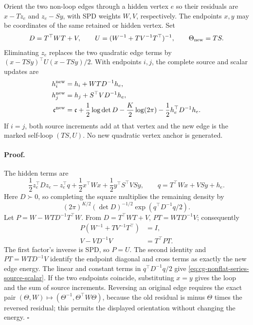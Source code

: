 Orient the two non-loop edges through a hidden vertex \(e\) so their
residuals are \(x-Tz_e\) and \(z_e-Sy\), with SPD weights \(W,V\),
respectively. The endpoints \(x,y\) may be coordinates of the same
retained or hidden vertex. Set
\begin{equation}
D=T^\top WT+V,\qquad
U=(W^{-1}+TV^{-1}T^\top)^{-1},\qquad
\Theta_{\rm new}=TS.
\label{eq:cg-nonflat-series-weight}
\end{equation}
Eliminating \(z_e\) replaces the two quadratic edge terms by
\((x-TSy)^\top U(x-TSy)/2\). With endpoints \(i,j\), the complete
source and scalar updates are
\begin{equation}
\begin{aligned}
h_i^{\rm new}&=h_i+WT D^{-1}h_e,\\
h_j^{\rm new}&=h_j+S^\top V D^{-1}h_e,\\
\mathfrak c^{\rm new}
&=\mathfrak c+\frac12\log\det D-\frac K2\log(2\pi)
                         -\frac12h_e^\top D^{-1}h_e.
\end{aligned}
\label{eq:cg-nonflat-series-source-scalar}
\end{equation}
If \(i=j\), both source increments add at that vertex and the
new edge is the marked self-loop \((TS,U)\). No new quadratic
vertex anchor is generated. 

\paragraph{Proof.}
The hidden terms are
\begin{equation}
\frac12z_e^\top Dz_e-z_e^\top q
+\frac12x^\top Wx+\frac12y^\top S^\top VSy,
\qquad q=T^\top Wx+VSy+h_e.
\label{eq:cg-nonflat-series-square-data}
\end{equation}
Here \(D\succ0\), so completing the square multiplies the remaining
density by
\begin{equation*}
(2\pi)^{K/2}(\det D)^{-1/2}\exp(q^\top D^{-1}q/2).
\end{equation*}
Let \(P=W-WTD^{-1}T^\top W\). From \(D=T^\top WT+V\),
\(PT=WTD^{-1}V\); consequently
\begin{equation}
\begin{aligned}
P(W^{-1}+TV^{-1}T^\top)&=I,\\
V-VD^{-1}V&=T^\top PT.
\end{aligned}
\label{eq:cg-nonflat-series-matrix-identities}
\end{equation}
The first factor's inverse is SPD, so \(P=U\).
The second identity and \(PT=WTD^{-1}V\) identify the endpoint
diagonal and cross terms as exactly the new edge energy.
The linear and constant terms in \(q^\top D^{-1}q/2\) give
\eqref{eq:cg-nonflat-series-source-scalar}. If the two endpoints
coincide, substituting \(x=y\) gives the loop and the sum of source
increments. Reversing an original edge requires the exact pair
\((\Theta,W)\mapsto(\Theta^{-1},\Theta^\top W\Theta)\),
because the old residual is minus \(\Theta\) times the reversed
residual; this permits the displayed orientation without changing
the energy. \(\square\)

